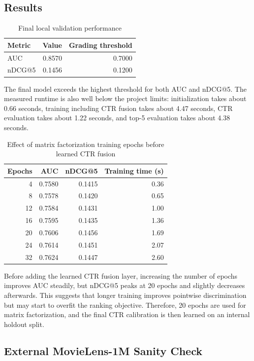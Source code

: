 \documentclass[onecolumn,a4paper,12pt]{IEEEtran}
\begin{document}
\subsection{Results}

\begin{table}[h]
\centering
\caption{Final local validation performance}
\begin{tabular}{lrr}
\toprule
Metric & Value & Grading threshold \\
\midrule
AUC & 0.8570 & 0.7000 \\
nDCG@5 & 0.1456 & 0.1200 \\
\bottomrule
\end{tabular}
\end{table}

The final model exceeds the highest threshold for both AUC and nDCG@5. The measured runtime is also well below the project limits: initialization takes about 0.66 seconds, training including CTR fusion takes about 4.47 seconds, CTR evaluation takes about 1.22 seconds, and top-5 evaluation takes about 4.38 seconds.

\begin{table}[h]
\centering
\caption{Effect of matrix factorization training epochs before learned CTR fusion}
\begin{tabular}{rrrr}
\toprule
Epochs & AUC & nDCG@5 & Training time (s) \\
\midrule
4  & 0.7580 & 0.1415 & 0.36 \\
8  & 0.7578 & 0.1420 & 0.65 \\
12 & 0.7584 & 0.1431 & 1.00 \\
16 & 0.7595 & 0.1435 & 1.36 \\
20 & 0.7606 & 0.1456 & 1.69 \\
24 & 0.7614 & 0.1451 & 2.07 \\
32 & 0.7624 & 0.1447 & 2.60 \\
\bottomrule
\end{tabular}
\end{table}

Before adding the learned CTR fusion layer, increasing the number of epochs improves AUC steadily, but nDCG@5 peaks at 20 epochs and slightly decreases afterwards. This suggests that longer training improves pointwise discrimination but may start to overfit the ranking objective. Therefore, 20 epochs are used for matrix factorization, and the final CTR calibration is then learned on an internal holdout split.

\subsection{External MovieLens-1M Sanity Check}
\end{document}
